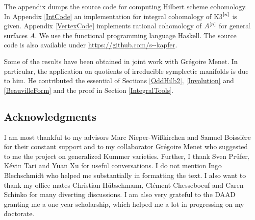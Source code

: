 The appendix dumps the source code for computing Hilbert scheme cohomology. In Appendix \ref{IntCode} an implementation for integral cohomology of K3$^{[n]}$ is given. 
Appendix \ref{VertexCode} implements rational cohomology of $A^{[n]}$ for general surfaces $A$. 
We use the functional programming language Haskell. 
The source code is also available under \url{https://github.com/s--kapfer}.
\vspace{5pt}

Some of the results have been obtained in joint work with Gr\'egoire Menet. In particular, the application on quotients of irreducible symplectic manifolds is due to him.
He contributed the essential of Sections \ref{OddHilb2}, \ref{Involution} and \ref{BeauvilleForm} and the proof in Section \ref{IntegralTools}.

\subsection{Acknowledgments}
I am most thankful to my advisors Marc Nieper-Wi\ss kirchen and Samuel Boissi\`ere for their constant support
and to my collaborator Gr\'egoire Menet who suggested to me the project on generalized Kummer varieties.
Further, I thank Sven Pr\"ufer, K\'evin Tari and Yuan Xu for useful conversations.
I do not mention Ingo Blechschmidt who helped me substantially in formatting the text.
I also want to thank my office mates Christian H\"ubschmann, Cl\'ement Chesseboeuf and Caren Schinko for many diverting discussions.
I am also very grateful to the DAAD granting me a one year scholarship, which helped me a lot in progressing on my doctorate. 
